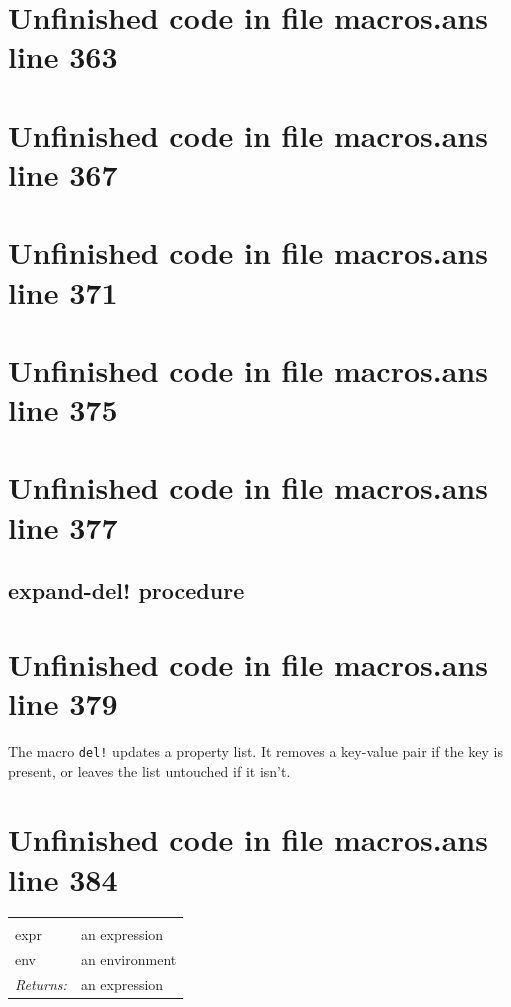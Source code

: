 \documentclass[twoside,9pt]{report}
\begin{document}
\section{Unfinished code in file macros.ans line 363}
\section{Unfinished code in file macros.ans line 367}
\section{Unfinished code in file macros.ans line 371}
\section{Unfinished code in file macros.ans line 375}
\section{Unfinished code in file macros.ans line 377}
\subsection{expand-del! procedure}
\label{expand-del"!-procedure}
\section{Unfinished code in file macros.ans line 379}


The macro \texttt{del!} updates a property list. It removes a key-value pair if the key is present, or leaves the list untouched if it isn't.

\section{Unfinished code in file macros.ans line 384}
\noindent\begin{tabular}{ |p{1.9cm} p{8cm}| }
\hline
\rowcolor[HTML]{CCCCCC} \multicolumn{2}{|l|}{\bf expand-del! (internal)} \\
expr & an expression \\
env & an environment \\
\textit{Returns:} & an expression \\
\hline
\end{tabular}
\end{document}
